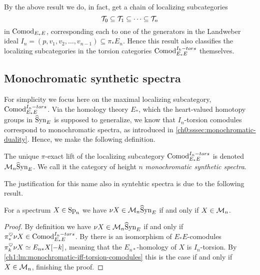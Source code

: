 \begin{remark}
    By the above result we do, in fact, get a chain of localizing subcategories
    \[\mathcal{T}_0 \subseteq \mathcal{T}_1\subseteq \cdots \subseteq \mathcal{T}_n \]
    in $\mathrm{Comod}_{E_*E}$, corresponding each to one of the generators in the Landweber ideal $I_n=(p, v_1, v_2, \ldots, v_{n-1})\subseteq \pi_* E_n$. Hence this result also classifies the localizing subcategories in the torsion categories $\mathrm{Comod}_{E_*E}^{I_k-tors}$ themselves.  
\end{remark}


\subsection{Monochromatic synthetic spectra}

For simplicity we focus here on the maximal localizing subcategory, $\mathrm{Comod}_{E_*E}^{I_n-tors}$. Via the homology theory $E_*$, which the heart-valued homotopy groups in $\widehat{\mathrm{S}}\mathrm{yn}_{E}$ is supposed to generalize, we know that $I_n$-torsion comodules correspond to monochromatic spectra, as introduced in \cref{ch0:sssec:monochromatic-duality}. Hence, we make the following definition. 

\begin{definition}
    The unique $\pi$-exact lift of the localizing subcategory $\mathrm{Comod}_{E_*E}^{I_n-tors}$ is denoted $\mathcal{M}_{n}\widehat{\mathrm{S}}\mathrm{yn}_{E}$. We call it the category of height $n$ \emph{monochromatic synthetic spectra}. 
\end{definition}

The justification for this name also in syntehtic spectra is due to the following result. 

\begin{lemma}
    \label{ch3:add:lm:mono-iff-syn-mono}
    For a spectrum $X\in \mathrm{Sp}_{n}$ we have $\nu X \in \mathcal{M}_{n}\widehat{\mathrm{S}}\mathrm{yn}_{E}$ if and only if $X\in \mathcal{M}_{n}$. 
\end{lemma}
\begin{proof}
    By definition we have $\nu X \in \mathcal{M}_{n}\widehat{\mathrm{S}}\mathrm{yn}_{E}$ if and only if $\pi_*^\heartsuit \nu X \in \mathrm{Comod}_{E_*E}^{I_n-tors}$. By \cite[4.21, 4.22]{pstragowski_2022} there is an isomorphism of $E_*E$-comodules $\pi_k^\heartsuit \nu X \simeq E_{n*} X[-k]$, meaning that the $E_{n*}$-homology of $X$ is $I_n$-torsion. By \cref{ch1:lm:monochromatic-iff-torsion-comodules} this is the case if and only if $X\in \mathcal{M}_{n}$, finishing the proof. 
\end{proof}










